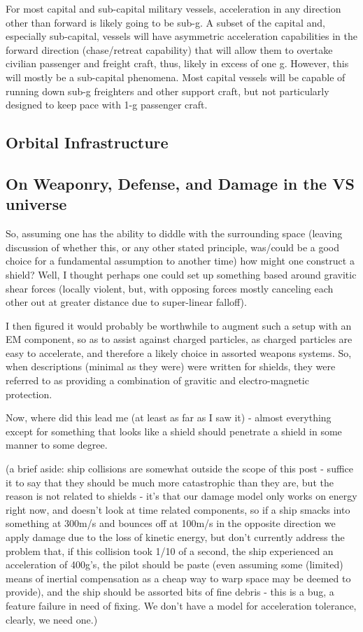 For most capital and sub-capital military vessels, acceleration in any
direction other than forward is likely going to be sub-g. A subset of
the capital and, especially sub-capital, vessels will have asymmetric
acceleration capabilities in the forward direction (chase/retreat
capability) that will allow them to overtake civilian passenger and
freight craft, thus, likely in excess of one g. However, this will
mostly be a sub-capital phenomena. Most capital vessels will be
capable of running down sub-g freighters and other support craft, but
not particularly designed to keep pace with 1-g passenger craft.

\subsection{Orbital Infrastructure}

\subsection{On Weaponry, Defense, and Damage in the VS universe}

So, assuming one has the ability to diddle with the surrounding space
(leaving discussion of whether this, or any other stated principle,
was/could be a good choice for a fundamental assumption to another
time) how might one construct a shield?  Well, I thought perhaps one
could set up something based around gravitic shear forces (locally
violent, but, with opposing forces mostly canceling each other out at
greater distance due to super-linear falloff).

I then figured it would probably be worthwhile to augment such a setup
with an EM component, so as to assist against charged particles, as
charged particles are easy to accelerate, and therefore a likely
choice in assorted weapons systems. So, when descriptions (minimal as
they were) were written for shields, they were referred to as
providing a combination of gravitic and electro-magnetic protection.

Now, where did this lead me (at least as far as I saw it) - almost
everything except for something that looks like a shield should
penetrate a shield in some manner to some degree.

(a brief aside: ship collisions are somewhat outside the scope of this
post - suffice it to say that they should be much more catastrophic
than they are, but the reason is not related to shields - it's that
our damage model only works on energy right now, and doesn't look at
time related components, so if a ship smacks into something at 300m/s
and bounces off at 100m/s in the opposite direction we apply damage
due to the loss of kinetic energy, but don't currently address the
problem that, if this collision took 1/10 of a second, the ship
experienced an acceleration of 400g's, the pilot should be paste (even
assuming some (limited) means of inertial compensation as a cheap way
to warp space may be deemed to provide), and the ship should be
assorted bits of fine debris - this is a bug, a feature failure in
need of fixing. We don't have a model for acceleration tolerance,
clearly, we need one.)

